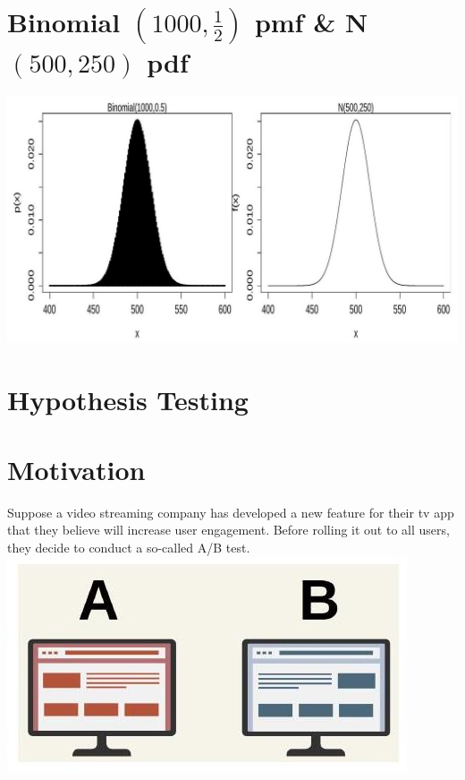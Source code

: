 \documentclass[10pt]{article}
\begin{document}
\section*{Binomial $\left(1000, \frac{1}{2}\right)$ pmf \& N $(500,250)$ pdf}
\begin{center}
\includegraphics[max width=\textwidth]{2025_05_12_2c033a5f0417cd8b136fg-34}
\end{center}

\section*{Hypothesis Testing}
\section*{Motivation}
Suppose a video streaming company has developed a new feature for their tv app that they believe will increase user engagement. Before rolling it out to all users, they decide to conduct a so-called A/B test.\\
\includegraphics[max width=\textwidth, center]{2025_05_12_2c033a5f0417cd8b136fg-36}
\end{document}
